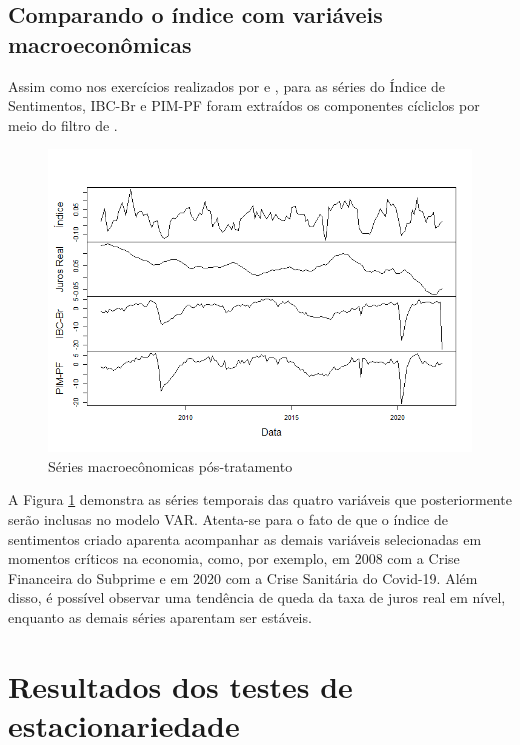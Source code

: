 \subsection{Comparando o índice com variáveis macroeconômicas}

Assim como nos exercícios realizados por  e , para as séries do Índice de Sentimentos, IBC-Br e PIM-PF foram extraídos os componentes cícliclos por meio do filtro de .

\begin{figure}[hbtp]
	\centering
	\caption{Séries macroecônomicas pós-tratamento} \label{figure:series_macro}
	\includegraphics[scale = 0.75]{figuras/graf_series_macro.png}
\end{figure}

A Figura \ref{figure:series_macro} demonstra as séries temporais das quatro variáveis que posteriormente serão inclusas no modelo VAR. Atenta-se para o fato de que o índice de sentimentos criado aparenta acompanhar as demais variáveis selecionadas em momentos críticos na economia, como, por exemplo, em 2008 com a Crise Financeira do Subprime e em 2020 com a Crise Sanitária do Covid-19. Além disso, é possível observar uma tendência de queda da taxa de juros real em nível, enquanto as demais séries aparentam ser estáveis.

\section{Resultados dos testes de estacionariedade} \label{section:testes_estac}

